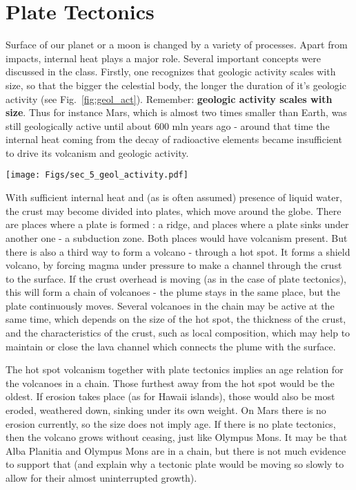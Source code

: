 \documentclass[paper=a4, fontsize=11pt]{scrartcl} %
\numberwithin{equation}{section} %
\begin{document}
\section{Plate Tectonics}

Surface of our planet or a moon is changed by a variety of processes. Apart from impacts, internal heat plays a major role. Several important concepts were discussed in the class. Firstly, one recognizes that geologic activity scales with size, so that the bigger the celestial body, the longer the duration of it's geologic activity (see Fig.~\ref{fig:geol_act}).  Remember:  \textbf{geologic activity scales with size}. Thus for instance Mars, which is almost two times smaller than Earth,  was still geologically active until about 600 mln years ago -  around that time the internal heat coming from the decay of radioactive elements became insufficient to drive its  volcanism and geologic activity. 


\begin{figure*}
\centering
	\texttt{[image: Figs/sec\_5\_geol\_activity.pdf]}
	\caption[geol_act]{Geologic activity scales with size}
	\label{fig:geol_act}
\end{figure*}  

With sufficient internal heat and (as is often assumed) presence of liquid water, the crust may become divided into plates, which move around the globe. There are places where a plate is formed : a ridge, and places where a plate sinks under another one  - a subduction zone. Both places would have volcanism present. But there is also a third way to form a volcano - through a hot spot. It forms a shield volcano, by forcing magma under pressure to make a channel through the crust to the surface.    If the crust  overhead is moving (as in the case of plate tectonics), this will form a chain of volcanoes - the plume stays in the same place, but the plate continuously moves.  Several volcanoes in the chain may be active at the same time,  which depends on the size of the hot spot, the thickness of the crust, and the characteristics of the crust, such as local composition, which may help to maintain or close the lava channel which connects the plume with the surface.  

The hot spot volcanism together with plate tectonics implies an age relation for the volcanoes in a chain. Those furthest away from the hot spot would be the oldest. If erosion takes place (as for Hawaii islands), those would also be most eroded, weathered down, sinking under its own weight.  On Mars there is no erosion currently, so the size does not imply age.  If there is no plate tectonics,  then the volcano grows without ceasing, just like Olympus Mons. It may be that Alba Planitia and Olympus Mons are in a chain, but there is not much evidence to support that (and explain why a tectonic plate would be moving so slowly to allow for their almost uninterrupted growth). 
\end{document}

